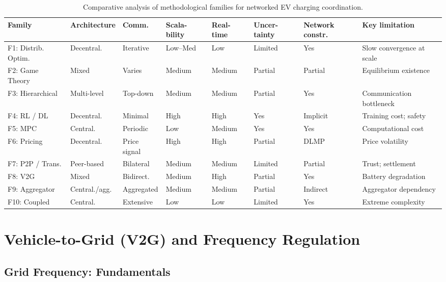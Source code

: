 \documentclass[review]{elsarticle}
\begin{document}
\begin{table}[!htbp]
\centering
\caption{Comparative analysis of methodological families for networked EV charging coordination.}
\label{tab:comparison}
\footnotesize
\begin{tabular}{p{1.8cm}p{1.5cm}p{1.5cm}p{1.3cm}p{1.3cm}p{1.5cm}p{1.5cm}p{1.8cm}}
\toprule
\textbf{Family} & \textbf{Architecture} & \textbf{Comm.} & \textbf{Scala- bility} & \textbf{Real- time} & \textbf{Uncer- tainty} & \textbf{Network constr.} & \textbf{Key limitation} \\
\midrule
F1: Distrib. Optim. & Decentral. & Iterative & Low--Med & Low & Limited & Yes & Slow convergence at scale \\
\addlinespace
F2: Game Theory & Mixed & Varies & Medium & Medium & Partial & Partial & Equilibrium existence \\
\addlinespace
F3: Hierarchical & Multi-level & Top-down & Medium & Medium & Partial & Yes & Communication bottleneck \\
\addlinespace
F4: RL / DL & Decentral. & Minimal & High & High & Yes & Implicit & Training cost; safety \\
\addlinespace
F5: MPC & Central. & Periodic & Low & Medium & Yes & Yes & Computational cost \\
\addlinespace
F6: Pricing & Decentral. & Price signal & High & High & Partial & DLMP & Price volatility \\
\addlinespace
F7: P2P / Trans. & Peer-based & Bilateral & Medium & Medium & Limited & Partial & Trust; settlement \\
\addlinespace
F8: V2G & Mixed & Bidirect. & Medium & High & Partial & Yes & Battery degradation \\
\addlinespace
F9: Aggregator & Central./agg. & Aggregated & Medium & Medium & Partial & Indirect & Aggregator dependency \\
\addlinespace
F10: Coupled & Central. & Extensive & Low & Low & Limited & Yes & Extreme complexity \\
\bottomrule
\end{tabular}
\end{table}
\section{Vehicle-to-Grid (V2G) and Frequency Regulation}

\subsection{Grid Frequency: Fundamentals}
\end{document}
